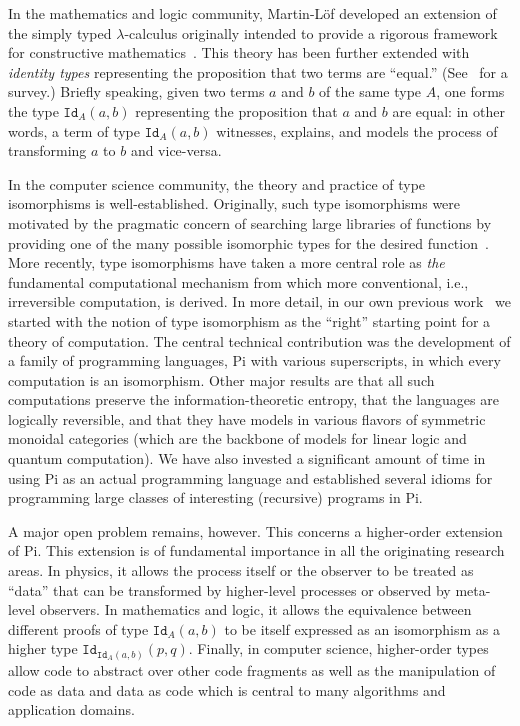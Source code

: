 \documentclass{llncs}
\begin{document}
In the mathematics and logic community, Martin-L\"of developed an extension
of the simply typed $\lambda$-calculus originally intended to provide a
rigorous framework for constructive
mathematics~\cite{citeulike:7374951}. This theory has been further extended
with \emph{identity types} representing the proposition that two terms are
``equal.'' (See~\cite{warren,streicher} for a survey.) Briefly speaking,
given two terms $a$ and $b$ of the same type $A$, one forms the type
$\texttt{Id}_A(a,b)$ representing the proposition that $a$ and $b$ are equal:
in other words, a term of type $\texttt{Id}_A(a,b)$ witnesses, explains, and
models the process of transforming $a$ to $b$ and vice-versa.

In the computer science community, the theory and practice of type
isomorphisms is well-established. Originally, such type isomorphisms were
motivated by the pragmatic concern of searching large libraries of functions
by providing one of the many possible isomorphic types for the desired
function~\cite{Rittri:1989:UTS:99370.99384}. More recently, type isomorphisms
have taken a more central role as \emph{the} fundamental computational
mechanism from which more conventional, i.e., irreversible computation, is
derived. In more detail, in our own previous
work~\cite{James:2012:IE:2103656.2103667,rc2011,rc2012} we started with the
notion of type isomorphism as the ``right'' starting point for a theory of
computation. The central technical contribution was the development of a
family of programming languages, {{Pi}} with various superscripts, in which
every computation is an isomorphism. Other major results are that all such
computations preserve the information-theoretic entropy, that the languages
are logically reversible, and that they have models in various flavors of
symmetric monoidal categories (which are the backbone of models for linear
logic and quantum computation). We have also invested a significant amount of
time in using {{Pi}} as an actual programming language and established
several idioms for programming large classes of interesting (recursive)
programs in {{Pi}}.

A major open problem remains, however. This concerns a higher-order extension
of {{Pi}}. This extension is of fundamental importance in all the
originating research areas. In physics, it allows the process itself or the
observer to be treated as ``data'' that can be transformed by higher-level
processes or observed by meta-level observers. In mathematics and logic, it
allows the equivalence between different proofs of type $\texttt{Id}_A(a,b)$
to be itself expressed as an isomorphism as a higher type
$\texttt{Id}_{\texttt{Id}_A(a,b)}(p,q)$. Finally, in computer science,
higher-order types allow code to abstract over other code fragments as well
as the manipulation of code as data and data as code which is central to many
algorithms and application domains.
\end{document}
